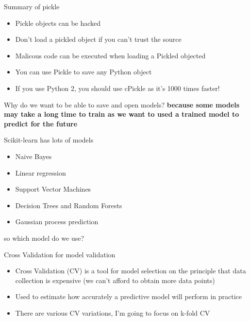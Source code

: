 \documentclass[10pt]{beamer}
\begin{document}
\begin{frame}{Summary of pickle}
\begin{itemize}
\item Pickle objects can be hacked
\item Don't load a pickled object if you can't trust the source
\item Malicous code can be executed when loading a Pickled objected
\item You can use Pickle to save any Python object
\item If you use Python 2, you should use cPickle as it's 1000 times faster!
\end{itemize}
\end{frame}


\begin{frame}{Why do we want to be able to save and open models?}
\textbf{because some models may take a long time to train as we want to used a trained model to predict for the future}
\end{frame}

\begin{frame}{Scikit-learn has lots of models}
\begin{itemize}
\item Naive Bayes
\item Linear regression
\item Support Vector Machines
\item Decision Trees and Random Forests
\item Gaussian process prediction
\end{itemize}
so which model do we use?
\end{frame}

\begin{frame}{Cross Validation for model validation}
\begin{itemize}
\item Cross Validation (CV) is a tool for model selection on the principle that data collection is expensive (we can't afford to obtain more data points)
\item Used to estimate how accurately a predictive model will perform in practice
\item There are various CV variations, I'm going to focus on k-fold CV
\end{itemize}
\end{frame}
\end{document}
